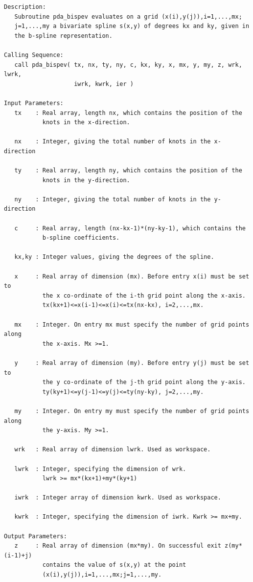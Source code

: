\documentclass[11pt,twoside]{article}
\begin{document}
\begin{verbatim}
Description:
   Subroutine pda_bispev evaluates on a grid (x(i),y(j)),i=1,...,mx; 
   j=1,...,my a bivariate spline s(x,y) of degrees kx and ky, given in 
   the b-spline representation.

Calling Sequence:
   call pda_bispev( tx, nx, ty, ny, c, kx, ky, x, mx, y, my, z, wrk, lwrk, 
                    iwrk, kwrk, ier ) 

Input Parameters:
   tx    : Real array, length nx, which contains the position of the
           knots in the x-direction.

   nx    : Integer, giving the total number of knots in the x-direction

   ty    : Real array, length ny, which contains the position of the
           knots in the y-direction.

   ny    : Integer, giving the total number of knots in the y-direction

   c     : Real array, length (nx-kx-1)*(ny-ky-1), which contains the
           b-spline coefficients.

   kx,ky : Integer values, giving the degrees of the spline.

   x     : Real array of dimension (mx). Before entry x(i) must be set to 
           the x co-ordinate of the i-th grid point along the x-axis. 
           tx(kx+1)<=x(i-1)<=x(i)<=tx(nx-kx), i=2,...,mx.

   mx    : Integer. On entry mx must specify the number of grid points along
           the x-axis. Mx >=1.

   y     : Real array of dimension (my). Before entry y(j) must be set to 
           the y co-ordinate of the j-th grid point along the y-axis.
           ty(ky+1)<=y(j-1)<=y(j)<=ty(ny-ky), j=2,...,my.

   my    : Integer. On entry my must specify the number of grid points along
           the y-axis. My >=1.

   wrk   : Real array of dimension lwrk. Used as workspace.

   lwrk  : Integer, specifying the dimension of wrk. 
           lwrk >= mx*(kx+1)+my*(ky+1)

   iwrk  : Integer array of dimension kwrk. Used as workspace.

   kwrk  : Integer, specifying the dimension of iwrk. Kwrk >= mx+my.

Output Parameters:
   z     : Real array of dimension (mx*my). On successful exit z(my*(i-1)+j) 
           contains the value of s(x,y) at the point 
           (x(i),y(j)),i=1,...,mx;j=1,...,my.


\end{verbatim}
\end{document}
